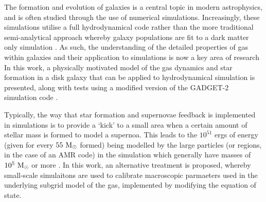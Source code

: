 The formation and evolution of galaxies is a central topic in modern astrophysics, and is often studied through the use of numerical simulations.
Increasingly, these simulations utilise a full hydrodynamical code \citep{schaye_eagle_2015,vogelsberger_introducing_2014} rather than the more traditional semi-analytical approach whereby galaxy populations are fit to a dark matter only simulation \citep{baugh_primer_2006, bower_breaking_2006}.
As such, the understanding of the detailed properties of gas within galaxies and their application to simulations is now a key area of research
In this work, a physically motivated model of the gas dynamics and star formation in a disk galaxy that can be applied to hydrodynamical simulation is presented, along with tests using a modified version of the GADGET-2 simulation code \citep{springel_cosmological_2003, springel_cosmological_2005}.

Typically, the way that star formation and supernovae feedback is implemented in simulations is to provide a `kick' to a small area when a certain amount of stellar mass is formed to model a supernoa.
This leads to the $10^{51}$ ergs of energy (given for every $55 ~\mathrm{M}_{\odot}$ formed) being modelled by the large particles (or regions, in the case of an AMR code) in the simulation which generally have masses of $10^5 ~\mathrm{M}_{\odot}$ or more \citep{tasker_simulating_2006, joung_dependence_2009, hummels_adaptive_2012, hopkins_meaning_2013, becerra_interstellar_2014}.
In this work, an alternative treatment is proposed, whereby small-scale simulaitons are used to calibrate macroscopic parmaeters used in the underlying subgrid model of the gas, implemented by modifying the equation of state.
